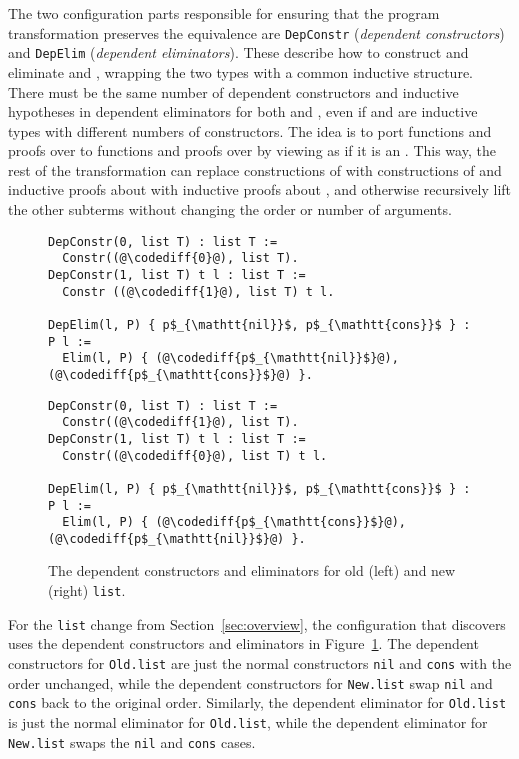 The two configuration parts responsible for ensuring that the program transformation preserves the 
equivalence are \lstinline{DepConstr} (\textit{dependent constructors}) 
and \lstinline{DepElim} (\textit{dependent eliminators}).
These describe how to construct and eliminate \A and \B, wrapping the two types with a common inductive structure.
There must be the same number of dependent constructors and inductive hypotheses in dependent eliminators for both \A and \B,
even if \A and \B are inductive types with different numbers of constructors.
The idea is to port functions and proofs over \A to functions and proofs over \B by viewing \B as if it is an \A.
This way, the rest of the transformation can replace constructions of \A with constructions of \B and
inductive proofs about \A with inductive proofs about \B, and otherwise recursively lift
the other subterms without changing the order or number of arguments.

\begin{figure}
\begin{minipage}{0.48\textwidth}
\begin{lstlisting}
DepConstr(0, list T) : list T :=
  Constr((@\codediff{0}@), list T).
DepConstr(1, list T) t l : list T :=
  Constr ((@\codediff{1}@), list T) t l.

DepElim(l, P) { p$_{\mathtt{nil}}$, p$_{\mathtt{cons}}$ } : P l :=
  Elim(l, P) { (@\codediff{p$_{\mathtt{nil}}$}@), (@\codediff{p$_{\mathtt{cons}}$}@) }.
\end{lstlisting}
\end{minipage}
\hfill
\begin{minipage}{0.48\textwidth}
\begin{lstlisting}
DepConstr(0, list T) : list T :=
  Constr((@\codediff{1}@), list T).
DepConstr(1, list T) t l : list T :=
  Constr((@\codediff{0}@), list T) t l.

DepElim(l, P) { p$_{\mathtt{nil}}$, p$_{\mathtt{cons}}$ } : P l :=
  Elim(l, P) { (@\codediff{p$_{\mathtt{cons}}$}@), (@\codediff{p$_{\mathtt{nil}}$}@) }.
\end{lstlisting}
\end{minipage}
\caption{The dependent constructors and eliminators for old (left) and new (right) \lstinline{list}.}
\label{fig:listconfig}
\end{figure}

For the \lstinline{list} change from Section~\ref{sec:overview},
the configuration that \toolname discovers uses the dependent constructors
and eliminators in Figure~\ref{fig:listconfig}. The dependent constructors for \lstinline{Old.list}
are just the normal constructors \lstinline{nil} and \lstinline{cons} with the order unchanged,
while the dependent constructors for \lstinline{New.list} swap \lstinline{nil} and \lstinline{cons}
back to the original order.
Similarly, the dependent eliminator for \lstinline{Old.list} is just the normal eliminator for \lstinline{Old.list},
while the dependent eliminator for \lstinline{New.list} swaps the \lstinline{nil} and \lstinline{cons} cases.

